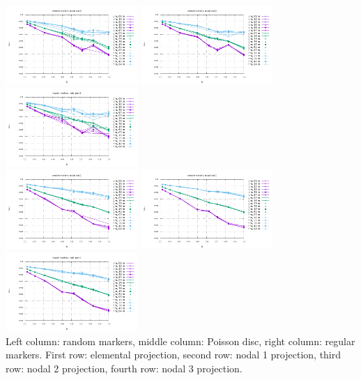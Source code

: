 \begin{center}
\includegraphics[width=5cm]{python_codes/fieldstone_13/vrms_rand_proj3} 
\includegraphics[width=5cm]{python_codes/fieldstone_13/vrms_poissondisc_proj3} 
\includegraphics[width=5cm]{python_codes/fieldstone_13/vrms_reg_proj3}\\
\includegraphics[width=5cm]{python_codes/fieldstone_13/vrms_rand_proj4} 
\includegraphics[width=5cm]{python_codes/fieldstone_13/vrms_poissondisc_proj4} 
\includegraphics[width=5cm]{python_codes/fieldstone_13/vrms_reg_proj4}\\
{\small Left column: random markers, middle column: Poisson disc, right column: regular markers.
First row: elemental projection, second row: nodal 1 projection, 
third row: nodal 2 projection, fourth row: nodal 3 projection. }
\end{center}

